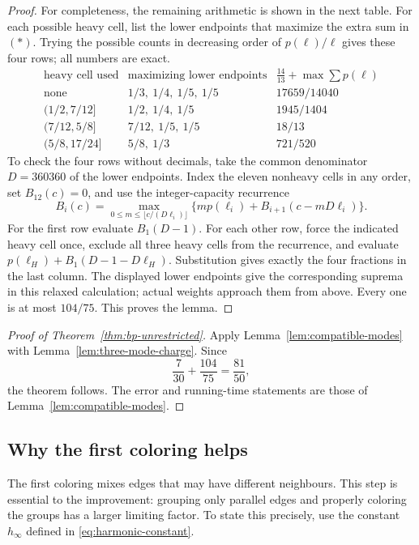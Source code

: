 \documentclass[11pt]{article}
\theoremstyle{definition}\newtheorem{algorithm}{Algorithm}[section]
\numberwithin{equation}{section}
\theoremstyle{remark}\newtheorem*{remark}{Remark}
\begin{document}
\begin{proof}
For completeness, the remaining arithmetic is shown in the next table.
For each possible heavy cell, list the lower endpoints that maximize the
extra sum in~$(*)$.  Trying the possible counts in decreasing order of
$p(\ell)/\ell$ gives these four rows; all numbers are exact.
\[
\begin{array}{c|c|c}
\text{heavy cell used}&\text{maximizing lower endpoints}
 &\frac{14}{13}+\max\sum p(\ell)\\ \hline
\text{none}&1/3,\ 1/4,\ 1/5,\ 1/5&17659/14040\\
(1/2,7/12]&1/2,\ 1/4,\ 1/5&1945/1404\\
(7/12,5/8]&7/12,\ 1/5,\ 1/5&18/13\\
(5/8,17/24]&5/8,\ 1/3&721/520
\end{array}
\]
To check the four rows without decimals, take the common denominator
$D=360360$ of the lower endpoints.  Index the eleven nonheavy cells in
any order, set $B_{12}(c)=0$, and use the integer-capacity recurrence
\[
 B_i(c)=\max_{0\le m\le\lfloor c/(D\ell_i)\rfloor}
       \{m p(\ell_i)+B_{i+1}(c-mD\ell_i)\}.
\]
For the first row evaluate $B_1(D-1)$.  For each other row, force the
indicated heavy cell once, exclude all three heavy cells from the
recurrence, and evaluate
$p(\ell_H)+B_1(D-1-D\ell_H)$.  Substitution gives exactly the four
fractions in the last column.  The displayed lower endpoints give the
corresponding suprema in this relaxed calculation; actual weights
approach them from above.
Every one is at most $104/75$.  This proves the lemma.
\end{proof}

\begin{proof}[Proof of Theorem~\ref{thm:bp-unrestricted}]
Apply Lemma~\ref{lem:compatible-modes} with
Lemma~\ref{lem:three-mode-charge}.  Since
\[
 \frac7{30}+\frac{104}{75}=\frac{81}{50},
\]
the theorem follows.  The error and running-time statements are those
of Lemma~\ref{lem:compatible-modes}.
\end{proof}


\subsection{Why the first coloring helps}
The first coloring mixes edges that may have different neighbours.
This step is essential to the improvement: grouping only parallel edges
and properly coloring the groups has a larger limiting factor.
To state this precisely, use the constant $h_\infty$ defined in
\eqref{eq:harmonic-constant}.
\end{document}
